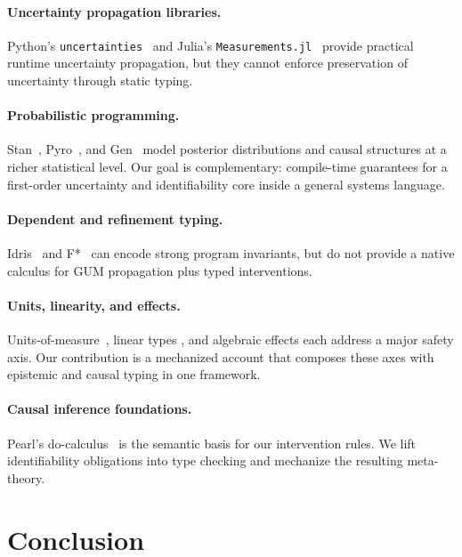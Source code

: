 \documentclass[acmsmall,screen,review,anonymous]{acmart}
\begin{document}
\paragraph{Uncertainty propagation libraries.}
Python's \texttt{uncertainties}~\cite{lebigot2024uncertainties} and
Julia's \texttt{Measurements.jl}~\cite{giordano2016measurements}
provide practical runtime uncertainty propagation, but they cannot
enforce preservation of uncertainty through static typing.

\paragraph{Probabilistic programming.}
Stan~\cite{carpenter2017stan}, Pyro~\cite{bingham2019pyro}, and
Gen~\cite{cusumano2019gen} model posterior distributions and causal
structures at a richer statistical level.
Our goal is complementary: compile-time guarantees for a first-order
uncertainty and identifiability core inside a general systems language.

\paragraph{Dependent and refinement typing.}
Idris~\cite{brady2013idris} and F*~\cite{swamy2016dependent} can encode
strong program invariants, but do not provide a native calculus for
GUM propagation plus typed interventions.

\paragraph{Units, linearity, and effects.}
Units-of-measure~\cite{kennedy2009units}, linear types
\cite{wadler1990linear}, and algebraic effects
\cite{plotkin2009handlers} each address a major safety axis.
Our contribution is a mechanized account that composes these axes with
epistemic and causal typing in one framework.

\paragraph{Causal inference foundations.}
Pearl's do-calculus~\cite{pearl2009causality} is the semantic basis for
our intervention rules.
We lift identifiability obligations into type checking and mechanize the
resulting meta-theory.

\section{Conclusion}
\label{sec:conclusion}
\end{document}
